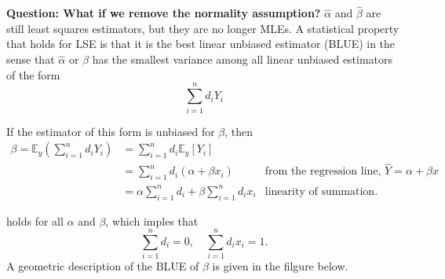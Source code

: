 \begin{example}
    \textbf{Question: What if we remove the normality assumption? } 
    $\widehat{\alpha}$ and $\widehat{\beta}$ are still least squares estimators, but they are no longer MLEs.
    A statistical property that holds for LSE is that it is the best linear unbiased estimator (BLUE) 
    in the sense that $\widehat{\alpha}$ or $\widehat{\beta}$ has the smallest variance among all linear unbiased estimators of the form 
    \begin{equation}
        \sum^n_{i=1} d_i Y_i
    \end{equation}

If the estimator of this form is unbiased for $\beta$, then 
\begin{align*}
    \beta = \mathbb{E}_y\left( \sum^n_{i=1} d_iY_i \right) &= \sum^n_{i = 1} d_i \mathbb{E}_y[Y_i]\\
    &= \sum^n_{i = 1} d_i (\alpha + \beta x_i) & \text{from the regression line, } \widehat{Y} = \alpha + \beta x\\
    &= \alpha \sum^n_{i = 1} d_i + \beta \sum^n_{i = 1} d_i x_i & \text{linearity of summation}.
\end{align*}

holds for all $\alpha$ and $\beta$, which imples that 
\[
    \sum^n_{i = 1} d_i = 0, \quad \sum^n_{i = 1} d_i x_i = 1.
\]
A geometric description  of the BLUE of $\beta$ is given in the filgure below.


\end{example}
